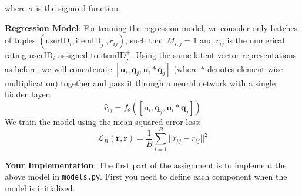 \documentclass[12pt]{article}
\begin{document}
    \noindent where $\sigma$ is the sigmoid function.

    \vspace{0.2cm}

    \noindent\textbf{Regression Model}: For training the regression model, we consider only batches of tuples $(\text{userID}_i, \text{itemID}_j^+, r_{ij})$, such that $M_{i, j} = 1$ and $r_{ij}$ is the numerical rating $\text{userID}_i$ assigned to $\text{itemID}_j^+$. Using the same latent vector representations as before, we will concatenate $[\mathbf{u}_i, \mathbf{q}_j, \mathbf{u}_i * \mathbf{q}_j]$ (where $*$ denotes element-wise multiplication) together and pass it through a neural network with a single hidden layer:
    \begin{equation}
        \hat{r}_{ij}=f_{\theta}([\mathbf{u}_i, \mathbf{q}_j, \mathbf{u}_i * \mathbf{q}_j])
        \label{eq:reg}
    \end{equation}
    We train the model using the mean-squared error loss:
    \begin{equation}
        \mathcal{L}_R(\mathbf{\hat{r}}, \mathbf{r})= \frac{1}{B}\sum_{i=1}^B ||\hat{r}_{ij}-r_{ij}||^2
        \label{eq:r}
    \end{equation}

    \vspace{0.2cm}

    \noindent \noindent\textbf{Your Implementation}: The first part of the assignment is to implement the above model in \texttt{models.py}. First you need to define each component when the model is initialized.
\end{document}
